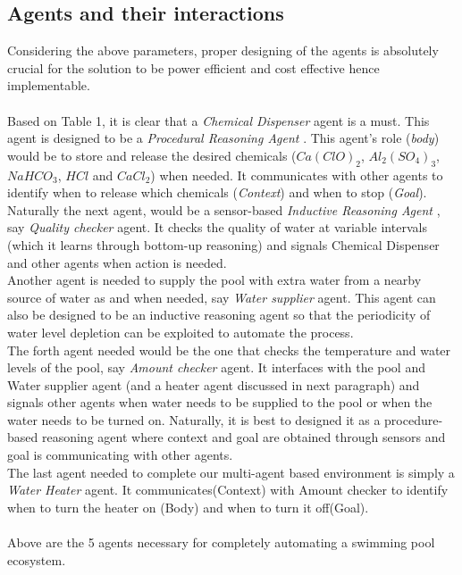 \documentclass[12pt]{article}
\begin{document}
    \subsection{Agents and their interactions}
    Considering the above parameters, proper designing of the agents is absolutely crucial for the solution to be power efficient and cost effective hence implementable.\\
    \\
    Based on Table 1, it is clear that a \textit{Chemical Dispenser} agent is a must. This agent is designed to be a \textit{Procedural Reasoning Agent} \cite{Wooldridge}. This agent's role (\textit{body}) would be to store and release the desired chemicals ($Ca(ClO)_2$, $Al_2(SO_4)_3$, $NaHCO_3$, $HCl$ and $CaCl_2$) when needed. It communicates with other agents to identify when to release which chemicals (\textit{Context}) and when to stop (\textit{Goal}).\\
    Naturally the next agent, would be a sensor-based \textit{Inductive Reasoning Agent} \cite{Wooldridge}, say \textit{Quality checker} agent. It checks the quality of water at variable intervals (which it learns through bottom-up reasoning) and signals Chemical Dispenser and other agents when action is needed.\\
    Another agent is needed to supply the pool with extra water from a nearby source of water as and when needed, say \textit{Water supplier} agent. This agent can also be designed to be an inductive reasoning agent so that the periodicity of water level depletion can be exploited to automate the process.\\
    The forth agent needed would be the one that checks the temperature and water levels of the pool, say \textit{Amount checker} agent. It interfaces with the pool and Water supplier agent (and a heater agent discussed in next paragraph) and signals other agents when water needs to be supplied to the pool or when the water needs to be turned on. Naturally, it is best to designed it as a procedure-based reasoning agent where context and goal are obtained through sensors and goal is communicating with other agents.\\
    The last agent needed to complete our multi-agent based environment is simply a \textit{Water Heater} agent. It communicates(Context) with Amount checker to identify when to turn the heater on (Body) and when to turn it off(Goal).\\
    \\
    Above are the 5 agents necessary for completely automating a swimming pool ecosystem.\\
\end{document}
